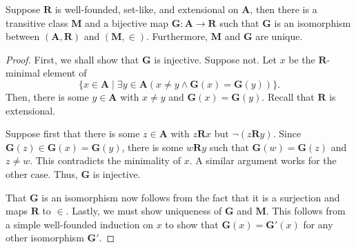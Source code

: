 \begin{theorem}
    Suppose $\mathbf R$ is well-founded, set-like, and extensional on $\mathbf A$, then there is a transitive class $\mathbf M$ and a bijective map $\mathbf G: \mathbf A\to\mathbf R$ such that $\mathbf G$ is an isomorphism between $(\mathbf A,\mathbf R)$ and $(\mathbf M,\in)$. Furthermore, $\mathbf M$ and $\mathbf G$ are unique.
\end{theorem}
\begin{proof}
    First, we shall show that $\mathbf G$ is injective. Suppose not. Let $x$ be the $\mathbf R$-minimal element of 
    \begin{equation*}
        \{x\in\mathbf A\mid \exists y\in\mathbf A(x\ne y\wedge \mathbf G(x) = \mathbf G(y))\}.
    \end{equation*}
    Then, there is some $y\in\mathbf A$ with $x\ne y$ and $\mathbf G(x) = \mathbf G(y)$. Recall that $\mathbf R$ is extensional. 

    Suppose first that there is some $z\in\mathbf A$ with $z\mathbf R x$ but $\neg(z\mathbf R y)$. Since $\mathbf G(z)\in\mathbf G(x) = \mathbf G(y)$, there is some $w\mathbf R y$ such that $\mathbf G(w) = \mathbf G(z)$ and $z\ne w$. This contradicts the minimality of $x$. A similar argument works for the other case. Thus, $\mathbf G$ is injective. 

    That $\mathbf G$ is an isomorphism now follows from the fact that it is a surjection and maps $\mathbf R$ to $\in$. Lastly, we must show uniqueness of $\mathbf G$ and $\mathbf M$. This follows from a simple well-founded induction on $x$ to show that $\mathbf G(x) = \mathbf G'(x)$ for any other isomorphism $\mathbf G'$.
\end{proof}

